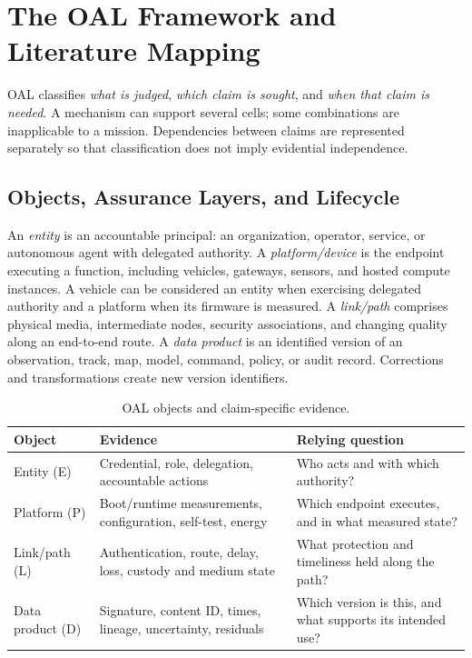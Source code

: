 \section{The OAL Framework and Literature Mapping}\label{sec:oal}

OAL classifies \emph{what is judged}, \emph{which claim is sought}, and \emph{when that claim is needed}. A mechanism can support several cells; some combinations are inapplicable to a mission. Dependencies between claims are represented separately so that classification does not imply evidential independence.

\subsection{Objects, Assurance Layers, and Lifecycle}

An \emph{entity} is an accountable principal: an organization, operator, service, or autonomous agent with delegated authority. A \emph{platform/device} is the endpoint executing a function, including vehicles, gateways, sensors, and hosted compute instances. A vehicle can be considered an entity when exercising delegated authority and a platform when its firmware is measured. A \emph{link/path} comprises physical media, intermediate nodes, security associations, and changing quality along an end-to-end route. A \emph{data product} is an identified version of an observation, track, map, model, command, policy, or audit record. Corrections and transformations create new version identifiers.

\begin{table}[!htb]
\caption{OAL objects and claim-specific evidence.\label{tab:objects}}
\begin{tabularx}{\textwidth}{@{}P{28mm}YY@{}}
\toprule
\textbf{Object} & \textbf{Evidence} & \textbf{Relying question}\\
\midrule
Entity (E) & Credential, role, delegation, accountable actions & Who acts and with which authority?\\
Platform (P) & Boot/runtime measurements, configuration, self-test, energy & Which endpoint executes, and in what measured state?\\
Link/path (L) & Authentication, route, delay, loss, custody and medium state & What protection and timeliness held along the path?\\
Data product (D) & Signature, content ID, times, lineage, uncertainty, residuals & Which version is this, and what supports its intended use?\\
\bottomrule
\end{tabularx}
\end{table}

